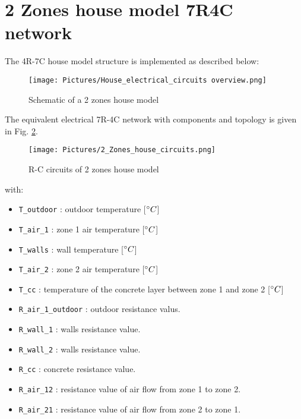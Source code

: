 \section{2 Zones house model 7R4C network}

The 4R-7C house model structure is implemented as described below:
	
\begin{figure}[H]
	\centering
	\texttt{[image: Pictures/House\_electrical\_circuits overview.png]}
	\caption[Short title]{Schematic of a 2 zones house model}
	\label{fig:schema7R4C}
	\end{figure} 
	
The equivalent electrical 7R-4C network with components and topology is given in Fig. \ref{fig:elec7R4C}.

\begin{figure}[H]
	\centering
	\texttt{[image: Pictures/2\_Zones\_house\_circuits.png]}
	\caption[Short title]{R-C circuits of 2 zones house model}
	\label{fig:elec7R4C}
	\end{figure}

with:
\begin{itemize}
    \item \texttt{T\_outdoor} : outdoor temperature [$^\circ C$] 
    \item \texttt{T\_air\_1}  : zone 1 air temperature [$^\circ C$]
    \item \texttt{T\_walls}   : wall temperature [$^\circ C$]
    \item \texttt{T\_air\_2}  : zone 2 air temperature [$^\circ C$]
    \item \texttt{T\_cc}      : temperature of the concrete layer between zone 1 and zone 2 [$^\circ C$]
    \item \texttt{R\_air\_1\_outdoor} : outdoor resistance valus.
    \item \texttt{R\_wall\_1} : walls resistance value.
    \item \texttt{R\_wall\_2} : walls resistance value.
    \item \texttt{R\_cc}      : concrete resistance value.
    \item \texttt{R\_air\_12} : resistance value of air flow from zone 1 to zone 2.
    \item \texttt{R\_air\_21} : resistance value of air flow from zone 2 to zone 1.

\end{itemize}
\newpage